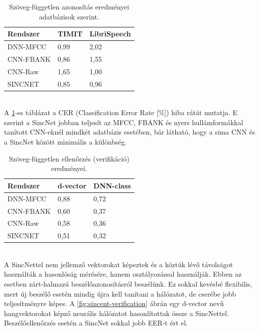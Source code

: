 \begin{table}[!ht]
	\begin{tabular}{*3l} \toprule
		\bfseries Rendszer & \bfseries TIMIT & \bfseries LibriSpeech \\ \midrule
		DNN-MFCC & 0,99 & 2,02 \\
		\rowcolor{gray!10} 
		CNN-FBANK & 0,86 & 1,55 \\
		CNN-Raw  & 1,65 & 1,00 \\
		\rowcolor{gray!10} 
		SINCNET & 0,85 & 0,96 \\
		\bottomrule
		\hline
	\end{tabular}
	\centering
	\caption{Szöveg-független azonosítás eredményei adatbázisok szerint.}
	\label{fig:sincnet-identification}
\end{table}
\ \\
A \ref{fig:sincnet-identification}-es táblázat a CER (Classification Error Rate [\%]) hiba rátát mutatja. E szerint a SincNet jobban teljesít az MFCC, FBANK és nyers hullámformákkal tanított CNN-eknél mindkét adatbázis esetében, bár látható, hogy a sima CNN és a SincNet között minimális a különbség.
\newline
\begin{table}[!ht]
	\begin{tabular}{*3l} \toprule
		\bfseries Rendszer & \bfseries d-vector & \bfseries DNN-class \\ \midrule
		DNN-MFCC & 0,88 & 0,72 \\
		\rowcolor{gray!10} 
		CNN-FBANK & 0,60 & 0,37 \\
		CNN-Raw  & 0,58 & 0,36 \\
		\rowcolor{gray!10} 
		SINCNET & 0,51 & 0,32 \\
		\bottomrule
		\hline
	\end{tabular}
	\centering
	\caption{Szöveg-független ellenőrzés (verifikáció) eredményei.}
	\label{fig:sincnet-verification}
\end{table}
\ \\
\newline
A SincNettel nem jellemző vektorokat képeztek és a köztük lévő távolságot használták a hasonlóság mérésére, hanem osztályozással használják. Ebben az esetben zárt-halmazú beszélőazonosításról beszélünk. Ez sokkal kevésbé flexibilis, mert új beszélő esetén mindig újra kell tanítani a hálózatot, de cserébe jobb teljesítményre képes. A \ref{fig:sincent-verification} ábrán egy d-vector nevű hangvektorokat képző neurális hálózatot hasonlítottak össze a SincNettel. Beszélőellenőrzés esetén a SincNet sokkal jobb EER-t ért el.
\newpage
